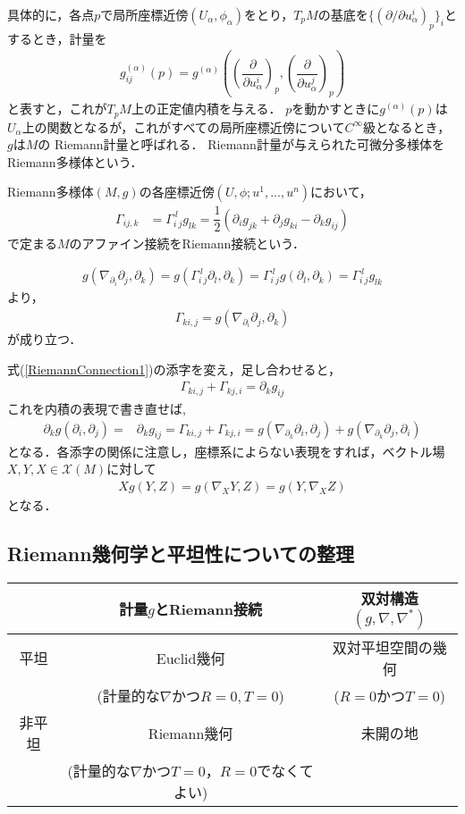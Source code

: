 \documentclass[dvipdfmx, a4paper,10pt]{jsarticle}
\theoremstyle{definition}
\newcommand{\eq}[1]{\begin{align}#1\end{align}}
\begin{document}
具体的に，各点$p$で局所座標近傍$(U_\alpha,\phi_\alpha)$をとり，$T_pM$の基底を$\{(\partial/\partial u^i_\alpha)_p\}_i$とするとき，計量を
\eq{g^{(\alpha)}_{ij}(p)=g^{(\alpha)}\left(\left(\dfrac{\partial}{\partial u^i_\alpha}\right)_p,\left(\dfrac{\partial}{\partial u^j_\alpha}\right)_p\right)
}
と表すと，これが$T_pM$上の正定値内積を与える．
$p$を動かすときに$g^{(\alpha)}(p)$は$U_\alpha$上の関数となるが，これがすべての局所座標近傍について$C^\infty$級となるとき，
$g$は$M$の%
Riemann計量と呼ばれる．
Riemann計量が与えられた可微分多様体をRiemann多様体という．

%
%
Riemann多様体$(M,g)$の各座標近傍$(U,\phi;u^1,...,u^n)$において，
\eq{\Gamma_{ij,k}&=\Gamma_ {i\ j}^{\ l}g_{lk}=\dfrac{1}{2}\left(\partial_ig_{jk}+\partial_jg_{ki}-\partial_kg_{ij}\right)\label{RiemannConnection1}}
で定まる$M$のアファイン接続をRiemann接続という．

\eq{g(\nabla_{\partial_i}\partial_j,\partial_k)=g\left(\Gamma_{i\ j}^{\ l}\partial_l,\partial_k\right)=\Gamma_{i\ j}^{\ l}g\left(\partial_l,\partial_k\right)=\Gamma_{i\ j}^{\ l}g_{lk}}
より，
\eq{\Gamma_{ki,j}=g(\nabla_{\partial_i}\partial_j,\partial_k)}
が成り立つ．　

式(\ref{RiemannConnection1})の添字を変え，足し合わせると，
\eq{\Gamma_{ki,j}+\Gamma_{kj,i}=\partial_kg_{ij}}
これを内積の表現で書き直せば,
\eq{\partial_kg(\partial_i,\partial_j)=&\partial_kg_{ij}=\Gamma_{ki,j}+\Gamma_{kj,i}=g(\nabla_{\partial_k}\partial_i,\partial_j)+g(\nabla_{\partial_k}\partial_j,\partial_i)}
となる．各添字の関係に注意し，座標系によらない表現をすれば，ベクトル場$X,Y,X\in\mathscr{X}(M)$に対して
\eq{Xg(Y,Z)=g(\nabla_XY,Z)=g(Y,\nabla_XZ)}
となる．


%
%
\subsection{Riemann幾何学と平坦性についての整理}

\begin{center}\begin{tabular}{|c|c|c|}\hline
& 計量$g$とRiemann接続 & 双対構造$(g,\nabla,\nabla^\ast)$\\\hline\hline
平坦 & Euclid幾何 & 双対平坦空間の幾何 \\
& (計量的な$\nabla$かつ$R=0,T=0$) & ($R=0$かつ$T=0$) \\\hline
非平坦 & Riemann幾何 & 未開の地 \\
& (計量的な$\nabla$かつ$T=0$，$R=0$でなくてよい) & \\\hline
\end{tabular}\end{center}
%
%
%
\end{document}

